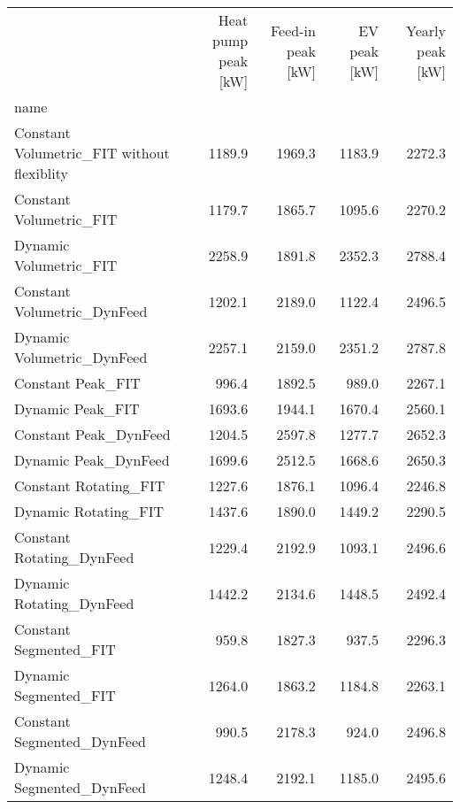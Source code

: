 \begin{tabular}{lrrrr}
\toprule
{} &  Heat pump peak [kW] &  Feed-in peak [kW] &  EV peak [kW] &  Yearly peak [kW] \\
name                                       &                      &                    &               &                   \\
\midrule
Constant Volumetric\_FIT without flexiblity &               1189.9 &             1969.3 &        1183.9 &            2272.3 \\
Constant Volumetric\_FIT                    &               1179.7 &             1865.7 &        1095.6 &            2270.2 \\
Dynamic Volumetric\_FIT                     &               2258.9 &             1891.8 &        2352.3 &            2788.4 \\
Constant Volumetric\_DynFeed                &               1202.1 &             2189.0 &        1122.4 &            2496.5 \\
Dynamic Volumetric\_DynFeed                 &               2257.1 &             2159.0 &        2351.2 &            2787.8 \\
Constant Peak\_FIT                          &                996.4 &             1892.5 &         989.0 &            2267.1 \\
Dynamic Peak\_FIT                           &               1693.6 &             1944.1 &        1670.4 &            2560.1 \\
Constant Peak\_DynFeed                      &               1204.5 &             2597.8 &        1277.7 &            2652.3 \\
Dynamic Peak\_DynFeed                       &               1699.6 &             2512.5 &        1668.6 &            2650.3 \\
Constant Rotating\_FIT                      &               1227.6 &             1876.1 &        1096.4 &            2246.8 \\
Dynamic Rotating\_FIT                       &               1437.6 &             1890.0 &        1449.2 &            2290.5 \\
Constant Rotating\_DynFeed                  &               1229.4 &             2192.9 &        1093.1 &            2496.6 \\
Dynamic Rotating\_DynFeed                   &               1442.2 &             2134.6 &        1448.5 &            2492.4 \\
Constant Segmented\_FIT                     &                959.8 &             1827.3 &         937.5 &            2296.3 \\
Dynamic Segmented\_FIT                      &               1264.0 &             1863.2 &        1184.8 &            2263.1 \\
Constant Segmented\_DynFeed                 &                990.5 &             2178.3 &         924.0 &            2496.8 \\
Dynamic Segmented\_DynFeed                  &               1248.4 &             2192.1 &        1185.0 &            2495.6 \\
\bottomrule
\end{tabular}
